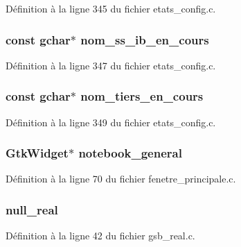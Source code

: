 Définition à la ligne 345 du fichier etats\_\-config.c.

\subsubsection[{nom\_\-ss\_\-ib\_\-en\_\-cours}]{\setlength{\rightskip}{0pt plus 5cm}const gchar$\ast$ {\bf nom\_\-ss\_\-ib\_\-en\_\-cours}}\label{etats__calculs_8c_aeebb77c73228c08a745bce2b31626184}


Définition à la ligne 347 du fichier etats\_\-config.c.

\subsubsection[{nom\_\-tiers\_\-en\_\-cours}]{\setlength{\rightskip}{0pt plus 5cm}const gchar$\ast$ {\bf nom\_\-tiers\_\-en\_\-cours}}\label{etats__calculs_8c_ad6c29bcab9528b5f233ca087daae59e2}


Définition à la ligne 349 du fichier etats\_\-config.c.

\subsubsection[{notebook\_\-general}]{\setlength{\rightskip}{0pt plus 5cm}GtkWidget$\ast$ {\bf notebook\_\-general}}\label{etats__calculs_8c_a8924516aa4170f932308e93cf93a785b}


Définition à la ligne 70 du fichier fenetre\_\-principale.c.

\subsubsection[{null\_\-real}]{ {\bf null\_\-real}}\label{etats__calculs_8c_a26f304bec3fdc0651b9aa8765d4de3c6}


Définition à la ligne 42 du fichier gsb\_\-real.c.

